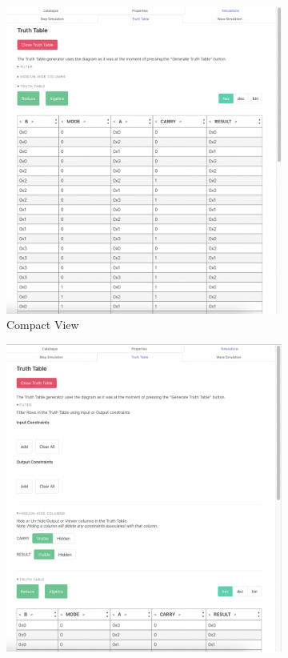 \begin{figure}[h]
     \centering
     \begin{subfigure}[b]{0.48\textwidth}
         \centering
         \includegraphics[width=\textwidth]{04.AnalysisDesign/compact.png}
         \caption{Compact View}
         \label{fig:compact}
     \end{subfigure}
     \begin{subfigure}[b]{0.48\textwidth}
         \centering
         \includegraphics[width=\textwidth]{04.AnalysisDesign/expanded.png}

\end{subfigure}
\end{figure}
